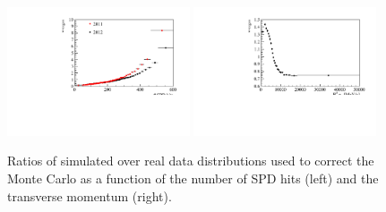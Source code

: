 \begin{figure}[h!]
\centering
\includegraphics[width=0.48\textwidth]{RKst/figs/nspd_w.pdf}
\includegraphics[width=0.48\textwidth]{RKst/figs/bpt_w.pdf}
\caption{ Ratios of simulated over real data distributions used to correct the Monte Carlo
as a function of the number of SPD hits (left) and the \Bz transverse momentum (right). }
\label{fig:b0pt_nSPD_ratios}
\end{figure}



